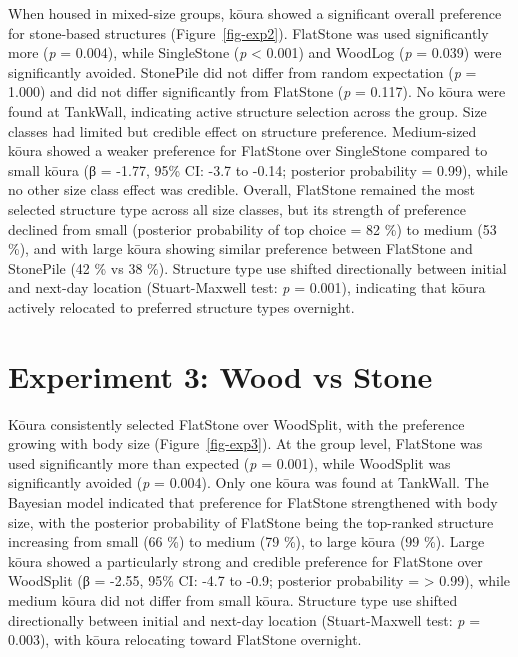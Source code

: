 \documentclass[
  12pt,
  a4paper,
]{scrbook}
\begin{document}
When housed in mixed-size groups, kōura showed a significant overall
preference for stone-based structures (Figure~\ref{fig-exp2}). FlatStone
was used significantly more (\emph{p} = 0.004), while SingleStone
(\emph{p} \textless{} 0.001) and WoodLog (\emph{p} = 0.039) were
significantly avoided. StonePile did not differ from random expectation
(\emph{p} = 1.000) and did not differ significantly from FlatStone
(\emph{p} = 0.117). No kōura were found at TankWall, indicating active
structure selection across the group. Size classes had limited but
credible effect on structure preference. Medium-sized kōura showed a
weaker preference for FlatStone over SingleStone compared to small kōura
(β = -1.77, 95\% CI: -3.7 to -0.14; posterior probability = 0.99), while
no other size class effect was credible. Overall, FlatStone remained the
most selected structure type across all size classes, but its strength
of preference declined from small (posterior probability of top choice =
82 \%) to medium (53 \%), and with large kōura showing similar
preference between FlatStone and StonePile (42 \% vs 38 \%). Structure
type use shifted directionally between initial and next-day location
(Stuart-Maxwell test: \emph{p} = 0.001), indicating that kōura actively
relocated to preferred structure types overnight.

\section{Experiment 3: Wood vs
Stone}\label{experiment-3-wood-vs-stone-1}

Kōura consistently selected FlatStone over WoodSplit, with the
preference growing with body size (Figure~\ref{fig-exp3}). At the group
level, FlatStone was used significantly more than expected (\emph{p} =
0.001), while WoodSplit was significantly avoided (\emph{p} = 0.004).
Only one kōura was found at TankWall. The Bayesian model indicated that
preference for FlatStone strengthened with body size, with the posterior
probability of FlatStone being the top-ranked structure increasing from
small (66 \%) to medium (79 \%), to large kōura (99 \%). Large kōura
showed a particularly strong and credible preference for FlatStone over
WoodSplit (β = -2.55, 95\% CI: -4.7 to -0.9; posterior probability =
\textgreater{} 0.99), while medium kōura did not differ from small
kōura. Structure type use shifted directionally between initial and
next-day location (Stuart-Maxwell test: \emph{p} = 0.003), with kōura
relocating toward FlatStone overnight.
\end{document}
